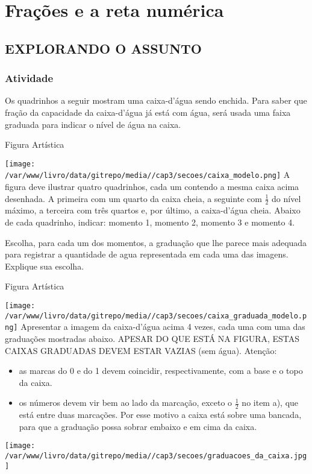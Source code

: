\documentclass[a4,12pt]{book}
\begin{document}
\chapter{Frações e a reta numérica }

\section{EXPLORANDO O ASSUNTO }

\subsection{Atividade}

Os quadrinhos a seguir mostram uma caixa-d'água sendo enchida. 
Para saber que fração da capacidade da caixa-d'água já está com água, será usada uma faixa graduada para indicar o nível de água na caixa. 

\begin{imagem*}[breakable]{}{}  Figura Artística  
  
    \texttt{[image: /var/www/livro/data/gitrepo/media//cap3/secoes/caixa\_modelo.png]}  
  A figura deve ilustrar quatro quadrinhos, cada um contendo a mesma caixa acima desenhada. A primeira com um quarto da caixa cheia, a seguinte com   $\frac{1}{2}$   do nível máximo, a terceira com três quartos e, por último, a caixa-d'água cheia. Abaixo de cada quadrinho, indicar: momento 1, momento 2, momento 3 e momento 4.  
\end{imagem*}

Escolha, para cada um dos momentos, a graduação que lhe parece mais adequada para registrar a quantidade de agua representada em cada uma das imagens. Explique sua escolha.


\begin{imagem*}[breakable]{}{}  Figura Artística  
  
    \texttt{[image: /var/www/livro/data/gitrepo/media//cap3/secoes/caixa\_graduada\_modelo.png]}  
  Apresentar a imagem da caixa-d'água acima 4 vezes, cada uma com uma das graduações mostradas abaixo. APESAR DO QUE ESTÁ NA FIGURA, ESTAS CAIXAS GRADUADAS DEVEM ESTAR VAZIAS (sem água).  
  Atenção:       
\begin{itemize} %
    \item       as marcas do 0 e do 1 devem coincidir, respectivamente, com a base e o topo da caixa.
    \item       os números devem vir bem ao lado da marcação, exceto o       $\frac{1}{2}$       no item a), que está entre duas marcações. Por esse motivo a caixa está sobre uma bancada, para que a graduação possa sobrar embaixo e em cima da caixa.
\end{itemize} %
  
    \texttt{[image: /var/www/livro/data/gitrepo/media//cap3/secoes/graduacoes\_da\_caixa.jpg]}  
\end{imagem*}
\end{document}
